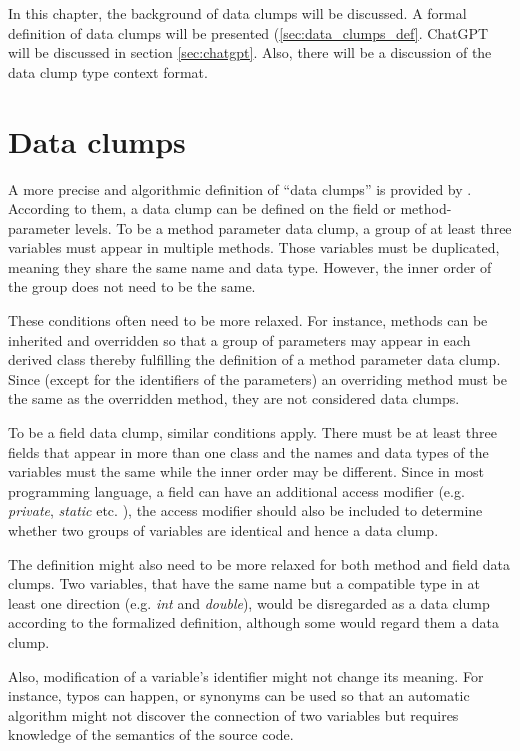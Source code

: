 In this chapter, the background of data clumps will be discussed. A formal definition of data clumps will be presented (\ref{sec:data_clumps_def}. ChatGPT will be discussed in section \ref{sec:chatgpt}. Also, there will be a discussion of the data clump type context format. 

\section{Data clumps}\label{sec:sec:data_clump_def}

A more precise and algorithmic  definition of \enquote{data clumps} is provided by \cite{zhangImprovingPrecisionFowler2008}. According to them, a data clump  can be defined on the field or method-parameter levels. 
To be a method parameter data clump, a group of at least three variables must appear in multiple methods. Those variables must be duplicated, meaning they share the same name and data type. However, the inner order of the group does not need to be the same. 

These conditions often need to be more relaxed. For instance, methods can be inherited and overridden so that a group of parameters may appear in each derived class thereby fulfilling the definition of a method parameter data clump. Since (except for the identifiers of the parameters) an overriding method must be the same as the overridden method, they are not considered data clumps. \cite{zhangImprovingPrecisionFowler2008}

To be a field data clump, similar conditions apply. There must be at least three fields that appear in more than one class and the names and data types of the variables must the same while the inner order may be different. Since in most programming language, a field can have an additional access modifier (e.g. \textit{private}, \textit{static} etc. ), the access modifier should also be included to determine whether two groups of variables are identical and hence a data clump.  \cite{zhangImprovingPrecisionFowler2008}

The definition might also need to be more relaxed for both method and field data clumps. Two variables, that have the same name but a compatible type in at least one direction  (e.g. \textit{int} and  \textit{double}), would be disregarded as a data clump according to the formalized definition, although some would regard them a data clump.

Also, modification of a variable's identifier might not change its meaning. For instance, typos can happen, or synonyms can be used so that an automatic algorithm might not discover the connection of two variables but requires  knowledge of the semantics of the source code. \cite{zhangImprovingPrecisionFowler2008}


